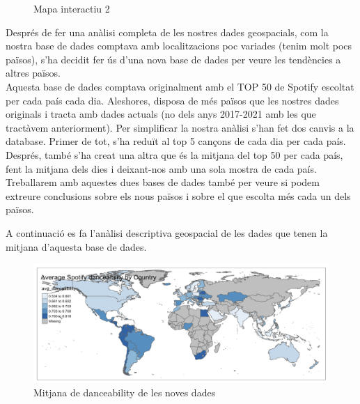 \begin{figure}[H]
\begin{minipage}{.5\textwidth}
        \caption{Mapa interactiu 2}
        \label{fig:geo_collab_country}
    \end{minipage}%
\end{figure}


Després de fer una anàlisi completa de les nostres dades geospacials, com la nostra base de dades comptava amb localitzacions poc variades (tenim molt pocs països), s'ha decidit fer ús d'una nova base de dades per veure les tendències a altres països. \\

Aquesta base de dades comptava originalment amb el TOP 50 de Spotify escoltat per cada país cada dia. Aleshores, disposa de més països que les nostres dades originals i tracta amb dades actuals (no dels anys 2017-2021 amb les que tractàvem anteriorment). Per simplificar la nostra anàlisi s'han fet dos canvis a la database. Primer de tot, s'ha reduït al top 5 cançons de cada dia per cada país. Després, també s'ha creat una altra que és la mitjana del top 50 per cada país, fent la mitjana dels dies i deixant-nos amb una sola mostra de cada país. Treballarem amb aquestes dues bases de dades també per veure si podem extreure conclusions sobre els nous països i sobre el que escolta més cada un dels països.

A continuació es fa l'anàlisi descriptiva geospacial de les dades que tenen la mitjana d'aquesta base de dades.

\begin{figure}[H]
    \centering
    \includegraphics[width=0.7\linewidth]{Images/7_Geospatial/4_data2024/data2024_danceability.png}
    \caption{Mitjana de danceability de les noves dades}
    \label{fig:geo_mean_danceability}
\end{figure}

